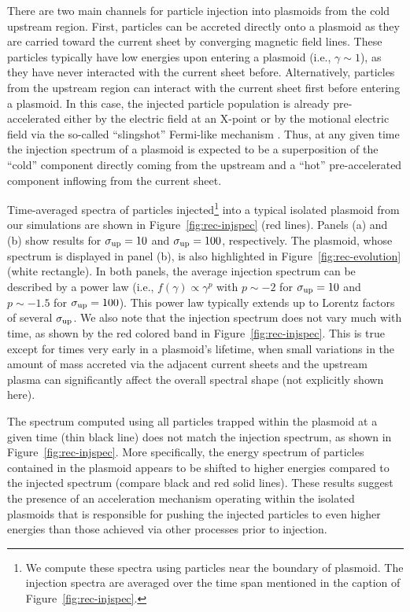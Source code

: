 There are two main channels for particle injection into plasmoids from the cold upstream region. First, particles can be accreted directly onto a plasmoid as they are carried toward the current sheet by converging magnetic field lines. These particles typically have low energies upon entering a plasmoid (i.e., $\gamma \sim 1$), as they have never interacted with the current sheet before. Alternatively, particles from the upstream region can interact with the current sheet first before entering a plasmoid. In this case, the injected particle population is already pre-accelerated either by the electric field at an X-point \citep{2001ApJ...562L..63Z, 2003ApJ...586...72L, 2008ApJ...682.1436L} or by the motional electric field via the so-called ``slingshot'' Fermi-like mechanism \citep{2006Natur.443..553D, 2014PhRvL.113o5005G, 2015ApJ...806..167G}. Thus, at any given time the injection spectrum of a plasmoid is expected to be a superposition of the ``cold'' component directly coming from the upstream and a ``hot''  pre-accelerated component inflowing from the current sheet. 

Time-averaged spectra of particles injected\footnote{
We compute these spectra using particles near the boundary of plasmoid. The injection spectra are averaged over the time span mentioned in the caption of Figure~\ref{fig:rec-injspec}.} into a typical isolated plasmoid from our simulations are shown in Figure~\ref{fig:rec-injspec} (red lines). Panels (a) and (b) show results for $\sigma_{\rm up}=10$ and $\sigma_{\rm up}=100$, respectively. The plasmoid, whose spectrum is displayed in panel (b), is also highlighted in Figure~\ref{fig:rec-evolution} (white rectangle). In both panels, the average injection spectrum can be described by a power law (i.e., $f(\gamma)\propto\gamma^{p}$ with $p\sim -2$ for $\sigma_{\rm up}=10$ and $p\sim -1.5$ for $\sigma_{\rm up}=100$). This power law typically extends up to Lorentz factors of several $\sigma_{\rm up}$. We also note that the injection spectrum does not vary much with time, as shown  by the red colored band in Figure~\ref{fig:rec-injspec}. This is true except for times very early in a plasmoid's lifetime, when small variations in the amount of mass accreted via the adjacent current sheets and the upstream plasma can significantly affect the overall spectral shape (not explicitly shown here). 

The spectrum computed using all particles trapped within the plasmoid at a given time (thin black line) does not match the injection spectrum, as shown in Figure~\ref{fig:rec-injspec}. More specifically, the energy spectrum of particles contained in the plasmoid appears to be shifted to higher energies compared to the injected spectrum (compare black and red solid lines). These results suggest the presence of an acceleration mechanism operating within the isolated plasmoids that is responsible for pushing the injected particles to even higher energies than those achieved via other processes prior to injection. 

